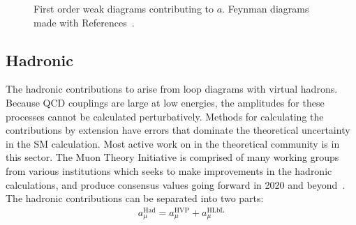 \begin{figure}
\caption[Electroweak diagrams contributing to the magnetic moment]{First order weak diagrams contributing to $a$. Feynman diagrams made with References~\cite{tikz-feynman,tikz-feynhand}.}	
\label{fig:EWDiagrams}
\end{figure}


\subsection{Hadronic}
\label{subsec:Hadronic}

The hadronic contributions to \amu arise from loop diagrams with virtual hadrons. Because QCD couplings are large at low energies, the amplitudes for these processes cannot be calculated perturbatively. Methods for calculating the contributions by extension have errors that dominate the theoretical uncertainty in the SM calculation. Most active work on \amu in the theoretical community is in this sector. The Muon \gmtwo Theory Initiative is comprised of many working groups from various institutions which seeks to make improvements in the hadronic calculations, and produce consensus values going forward in 2020 and beyond~\cite{TheoryInitiative}. The hadronic contributions can be separated into two parts:
		\begin{align}
            a_{\mu}^{\text{Had}} = a_{\mu}^{\text{HVP}} + a_{\mu}^{\text{HLbL}}
        \label{eq:HadSplit}
		\end{align}


